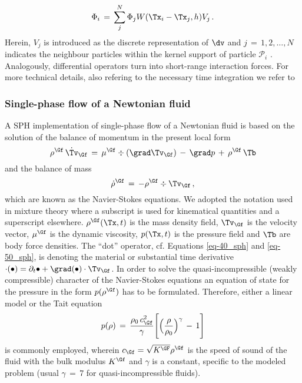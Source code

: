 \begin{equation}
\label{eq:SPH_discrete_field_function}
    \Phi_i \, = \, \sum_j^N \Phi_j W(\Tx_i  -  \Tx_j, h) V_j \, .
\end{equation}
Herein, $V_j$ is introduced as the discrete representation of $ \dv$ and $j \, = \, 1,2, \dots, N $ indicates the neighbour particles within the kernel support of particle $\mathcal{P}_i$ . Analogously, differential operators turn into short-range interaction forces. For more technical details, also refering to the necessary time integration we refer to

\subsubsection{Single-phase flow of a Newtonian fluid}
A SPH implementation of single-phase flow of a Newtonian fluid is based on the solution of the balance of momentum in the present local form
\begin{equation}
\label{eq-40_sph}
    \rho^\Gf \,\dot{\Tv}_\Gf \, = \, \mu^\Gf \div (\grad \Tv_\Gf) \, - \, \grad p \, + \, \rho^\Gf\,\Tb 
\end{equation}
and the balance of mass
\begin{equation}
\label{eq-50_sph}
    \dot{\rho}^\Gf \, = \, -\rho^\Gf \div \Tv_\Gf \, ,
\end{equation}
which are known as the Navier-Stokes equations.
We adopted the notation used in mixture theory  where a subscript is used for kinematical quantities and a superscript elsewhere.
$\rho^\Gf (\Tx, t)$ is the mass density field, $\Tv_\Gf $ is the velocity vector, $\mu^\Gf $ is the dynamic viscosity, $p (\Tx, t)$ is the pressure field and $\Tb$ are body force densities.
The ``dot'' operator, cf. Equations \ref{eq-40_sph} and \ref{eq-50_sph},
is denoting the material or substantial time derivative 
$\cdot{(\bullet)} = \partial_t{\bullet} + \grad(\bullet) \cdot \Tv_\Gf$.
In order to solve the quasi-incompressible (weakly compressible) character of the Navier-Stokes equations 
an equation of state for the pressure in the form
$p(\rho^\Gf)$ has to be formulated.
Therefore, either a linear model or the Tait equation \cite{hayward1967compressibility}
\begin{equation}
\label{eq:SPH_tait_eos}
    p(\rho) \, = \, \frac{\rho_0\,c^2_\Gf}{\gamma} \Bigg[ \Big( \frac{\rho}{\rho_0} \Big)^\gamma \, - \, 1 \Bigg]
\end{equation}
is commonly employed, wherein $c_\Gf = \sqrt{K^\GF}{\rho^\Gf}$ is the speed of sound of the fluid with the bulk modulus $K^\Gf$ and $\gamma$ is 
a constant, specific to the modeled problem (usual $\gamma \, = \, 7 $ for quasi-incompressible fluids).

